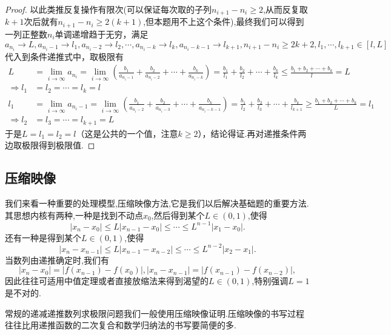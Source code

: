 \documentclass[../../main.tex]{subfiles}
\begin{document}
\begin{proof}
以此类推反复操作有限次(可以保证每次取的子列$n_{i+1}-n_i\geqslant  2$,从而反复取$k+1$次后就有$n_{i+1}-n_i\geqslant  2(k+1)$,但本题用不上这个条件),最终我们可以得到一列正整数\(n_i\)单调递增趋于无穷，满足
\[a_{n_i}\to L,a_{n_i - 1}\to l_1,a_{n_i - 2}\to l_2,\cdots,a_{n_i - k}\to l_k,a_{n_i - k - 1}\to l_{k + 1},n_{i + 1}-n_i\geqslant 2k + 2,l_1,\cdots,l_{k + 1}\in[l,L]\]
代入到条件递推式中，取极限有
\begin{align*}
L&=\lim_{i\rightarrow\infty}a_{n_i}=\lim_{i\rightarrow\infty}\left(\frac{b_1}{a_{n_i - 1}}+\frac{b_2}{a_{n_i - 2}}+\cdots+\frac{b_k}{a_{n_i - k}}\right)=\frac{b_1}{l_1}+\frac{b_2}{l_2}+\cdots+\frac{b_k}{l_k}\leqslant \frac{b_1 + b_2+\cdots + b_k}{l}=L\\
\Rightarrow l_1&=l_2=\cdots=l_k = l\\
l_1&=\lim_{i\rightarrow\infty}a_{n_i - 1}=\lim_{i\rightarrow\infty}\left(\frac{b_1}{a_{n_i - 2}}+\frac{b_2}{a_{n_i - 3}}+\cdots+\frac{b_k}{a_{n_i - k - 1}}\right)=\frac{b_1}{l_2}+\frac{b_2}{l_3}+\cdots+\frac{b_k}{l_{k + 1}}\geqslant \frac{b_1 + b_2+\cdots + b_k}{L}=l_1\\
\Rightarrow l_2&=l_3=\cdots=l_{k + 1}=L
\end{align*}
于是\(L = l_1 = l_2=l\)（这是公共的一个值，注意\(k\geqslant 2\)），结论得证.再对递推条件两边取极限得到极限值.

\end{proof}



\subsection{压缩映像}
我们来看一种重要的处理模型,压缩映像方法,它是我们以后解决基础题的重要方法.其思想内核有两种,一种是找到不动点\(x_0\),然后得到某个\(L\in(0,1)\),使得
\[
|x_n - x_0|\leqslant  L|x_{n - 1} - x_0|\leqslant \cdots\leqslant  L^{n - 1}|x_1 - x_0|.
\]
还有一种是得到某个\(L\in(0,1)\),使得
\[
|x_n - x_{n - 1}|\leqslant  L|x_{n - 1} - x_{n - 2}|\leqslant \cdots\leqslant  L^{n - 2}|x_2 - x_1|.
\]
当数列由递推确定时,我们有
\[
|x_n - x_0| = |f(x_{n - 1}) - f(x_0)|,|x_n - x_{n - 1}| = |f(x_{n - 1}) - f(x_{n - 2})|,
\]
因此往往可适用中值定理或者直接放缩法来得到渴望的\(L\in(0,1)\),特别强调\(L = 1\)是不对的.

\begin{note}
常规的递减递推数列求极限问题我们一般使用压缩映像证明.压缩映像的书写过程往往比用递推函数的二次复合和数学归纳法的书写要简便的多.
\end{note}
\end{document}
